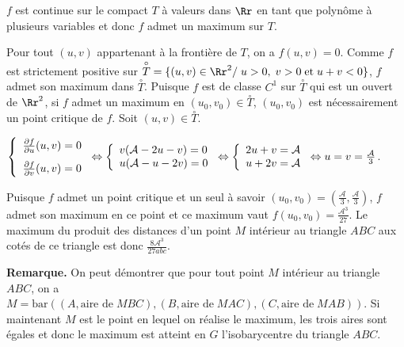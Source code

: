 {{$f$ est continue sur le compact $T$ à valeurs dans $\Rr$ en tant que polynôme à plusieurs variables et donc $f$ admet un maximum sur $T$.

Pour tout $(u,v)$ appartenant à la frontière de $T$, on a $f(u,v)=0$. Comme $f$ est strictement positive sur $\overset{\circ}{T}=\{(u,v)\in\Rr^2/\;u>0,\;v>0\;\text{et}\;u+v<0\}$, $f$ admet son maximum dans $\overset{\circ}{T}$. Puisque $f$ est de classe $C^1$ sur $\overset{\circ}{T}$ qui est un ouvert de $\Rr^2$, si $f$ admet un maximum en $(u_0,v_0)\in\overset{\circ}{T}$, $(u_0,v_0)$ est nécessairement un point critique de $f$. Soit $(u,v)\in\overset{\circ}{T}$.

\begin{center}
$\left\{
\begin{array}{l}
 \frac{\partial f}{\partial u}(u,v)=0\\
\rule{0mm}{6mm} \frac{\partial f}{\partial v}(u,v)=0
\end{array}
\right.\Leftrightarrow\left\{
\begin{array}{l}
v(\mathcal{A}-2u-v)=0\\
u(\mathcal{A}-u-2v)=0
\end{array}
\right.\Leftrightarrow\left\{
\begin{array}{l}
2u+v=\mathcal{A}\\
u+2v=\mathcal{A}
\end{array}
\right.\Leftrightarrow u=v= \frac{\mathcal{A}}{3}$.
\end{center}

Puisque $f$ admet un point critique et un seul à savoir $(u_0,v_0)=\left( \frac{\mathcal{A}}{3}, \frac{\mathcal{A}}{3}\right)$, $f$ admet son maximum en ce point et ce maximum vaut $f(u_0,v_0)= \frac{\mathcal{A}^3}{27}$. Le maximum du produit des distances d'un point $M$ intérieur au triangle $ABC$ aux cotés de ce triangle est donc $ \frac{8\mathcal{A}^3}{27abc}$.

\textbf{Remarque.} On peut démontrer que pour tout point $M$ intérieur au triangle $ABC$, on a $M=\text{bar}\left((A,\text{aire de}\;MBC),(B,\text{aire de}\;MAC),(C,\text{aire de}\;MAB)\right)$. Si maintenant $M$ est le point en lequel on réalise le maximum, les trois aires sont égales et donc le maximum est atteint en $G$ l'isobarycentre du triangle $ABC$.}
}